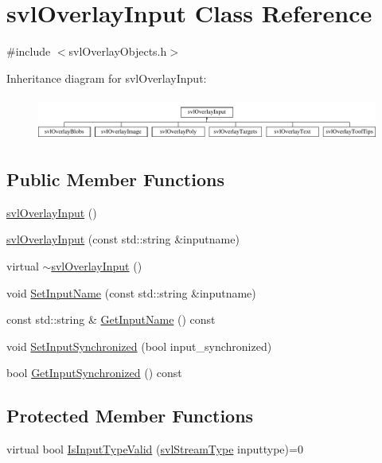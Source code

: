 \hypertarget{classsvl_overlay_input}{\section{svl\-Overlay\-Input Class Reference}
\label{classsvl_overlay_input}
}


{\ttfamily \#include $<$svl\-Overlay\-Objects.\-h$>$}

Inheritance diagram for svl\-Overlay\-Input\-:\begin{figure}[H]
\begin{center}
\leavevmode
\includegraphics[height=1.447028cm]{d8/dc9/classsvl_overlay_input}
\end{center}
\end{figure}
\subsection*{Public Member Functions}
\begin{DoxyCompactItemize}
\item 
\hyperlink{classsvl_overlay_input_a752be26953e3d757b115eaa63acfcd13}{svl\-Overlay\-Input} ()
\item 
\hyperlink{classsvl_overlay_input_afc6d5bc44367183a4aa2164c0eda08a0}{svl\-Overlay\-Input} (const std\-::string \&inputname)
\item 
virtual \hyperlink{classsvl_overlay_input_a029c1a43a098b13b94cc7946b2cee183}{$\sim$svl\-Overlay\-Input} ()
\item 
void \hyperlink{classsvl_overlay_input_ad89bc67fa2bd806935da29c0495eafed}{Set\-Input\-Name} (const std\-::string \&inputname)
\item 
const std\-::string \& \hyperlink{classsvl_overlay_input_a3983146471136e7a4ff51b408b93e04c}{Get\-Input\-Name} () const 
\item 
void \hyperlink{classsvl_overlay_input_a273736f75670296898ebf854baac6021}{Set\-Input\-Synchronized} (bool input\-\_\-synchronized)
\item 
bool \hyperlink{classsvl_overlay_input_ab02133532556e003fbfdbab46540f5d5}{Get\-Input\-Synchronized} () const 
\end{DoxyCompactItemize}
\subsection*{Protected Member Functions}
\begin{DoxyCompactItemize}
\item 
virtual bool \hyperlink{classsvl_overlay_input_a8b5f017395cf28ad9cad02bfc1d3c0e3}{Is\-Input\-Type\-Valid} (\hyperlink{svl_definitions_8h_aa00696d338a58db361335a01fd11e122}{svl\-Stream\-Type} inputtype)=0
\end{DoxyCompactItemize}
